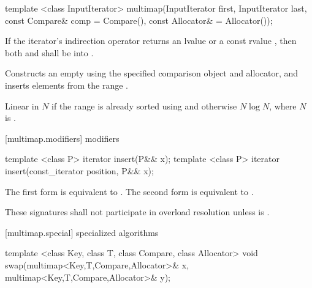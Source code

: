 %
%
\begin{itemdecl}
template <class InputIterator>
  multimap(InputIterator first, InputIterator last,
           const Compare& comp = Compare(),
           const Allocator& = Allocator());
\end{itemdecl}

\begin{itemdescr}
\pnum
\requires If the iterator's indirection operator returns an lvalue or a
const rvalue , then both
 and  shall be
 into .

\pnum
\effects
Constructs an empty
using the specified comparison object and allocator,
and inserts elements from the range
.

\pnum
\complexity
Linear in $N$ if the range
is already sorted using 
and otherwise $N \log{N}$,
where $N$ is
.
\end{itemdescr}

[multimap.modifiers]{ modifiers}

%
%
\begin{itemdecl}
template <class P> iterator insert(P&& x);
template <class P> iterator insert(const_iterator position, P&& x);
\end{itemdecl}

\begin{itemdescr}
\pnum
\effects
The first form is equivalent to 
. The second form is
equivalent to .

\pnum
\remarks
These signatures shall not participate in overload resolution
unless  is
.
\end{itemdescr}

[multimap.special]{ specialized algorithms}

%
%
\begin{itemdecl}
template <class Key, class T, class Compare, class Allocator>
  void swap(multimap<Key,T,Compare,Allocator>& x,
            multimap<Key,T,Compare,Allocator>& y);
\end{itemdecl}

